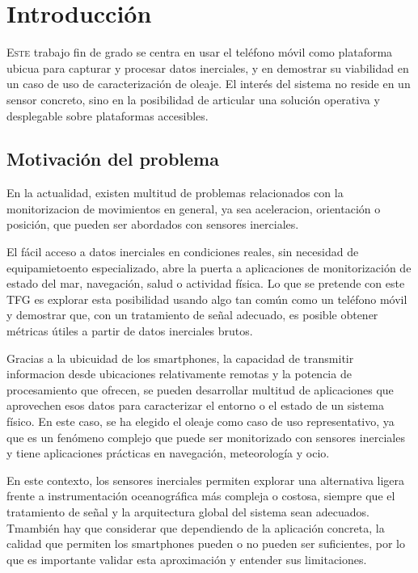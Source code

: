 \chapter{Introducción}
\label{chap:introducion}

\lettrine{E}{ste} trabajo fin de grado se centra en usar el teléfono móvil como plataforma ubicua para capturar y procesar datos inerciales, y en demostrar su viabilidad en un caso de uso de caracterización de oleaje.
El interés del sistema no reside en un sensor concreto, sino en la posibilidad de articular una solución operativa y desplegable sobre plataformas accesibles.

\section{Motivación del problema}

En la actualidad, existen multitud de problemas relacionados con la monitorizacion de movimientos en general, ya sea aceleracion, orientación o posición, que pueden ser abordados con sensores inerciales.

El fácil acceso a datos inerciales en condiciones reales, sin necesidad de equipamietoento especializado, abre la puerta a aplicaciones de monitorización de estado del mar, navegación, salud o actividad física. Lo que se pretende con este TFG es explorar esta posibilidad usando algo tan común como un teléfono móvil y demostrar que, con un tratamiento de señal adecuado, es posible obtener métricas útiles a partir de datos inerciales brutos.

Gracias a la ubicuidad de los smartphones, la capacidad de transmitir informacion desde ubicaciones relativamente remotas y la potencia de procesamiento que ofrecen,  se pueden desarrollar multitud de aplicaciones que aprovechen esos datos para caracterizar el entorno o el estado de un sistema físico. En este caso, se ha elegido el oleaje como caso de uso representativo, ya que es un fenómeno complejo que puede ser monitorizado con sensores inerciales y tiene aplicaciones prácticas en navegación, meteorología y ocio.

En este contexto, los sensores inerciales permiten explorar una alternativa ligera frente a instrumentación oceanográfica más compleja o costosa, siempre que el tratamiento de señal y la arquitectura global del sistema sean adecuados. Tmambién hay que considerar que dependiendo de la aplicación concreta, la calidad que permiten los smartphones pueden o no pueden ser suficientes, por lo que es importante validar esta aproximación y entender sus limitaciones.

